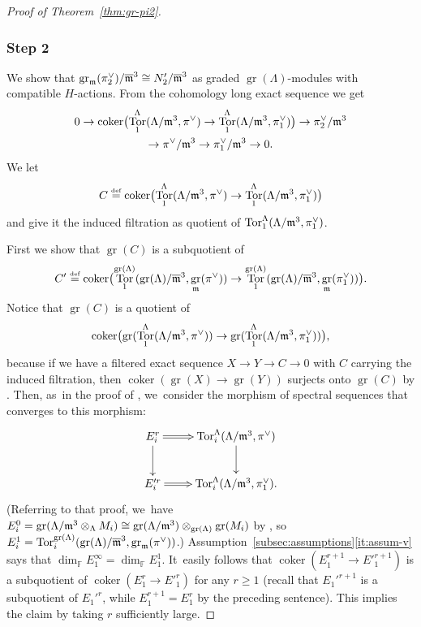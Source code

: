 \documentclass[JEP,XML,SOM,Unicode,NoFloatCountersInSection, NoEqCountersInSection,published]{cedram}
\let\ovl\overline
\newcommand{\defeq}{\stackrel{\textrm{\tiny{\upshape{def}}}}{=}}
\newcommand{\F}{\mathbb{F}}
\DeclareMathOperator{\coker}{coker}
\DeclareMathOperator{\gr}{gr}
\DeclareMathOperator{\Tor}{Tor}
\theoremstyle{plain}
\theoremstyle{definition}
\begin{document}
\begin{proof}[Proof of Theorem~\ref{thm:gr-pi2}]
\subsubsection*{Step 2} We show that $\gr_\m(\pi_2^\vee)/ \ovl\m^3 \cong N_2'/\ovl\m^3$ as graded $\gr(\Lambda)$-modules with compatible $H$-actions.
From the cohomology long exact sequence we get
\begin{multline}\label{eq:coho-seq}
0 \to \coker\bigl(\Tor_1^\Lambda(\Lambda/\m^3,\pi^\vee) \to \Tor_1^\Lambda(\Lambda/\m^3,\pi_1^\vee)\bigr) \to \pi_2^\vee/\m^3\\
\to \pi^\vee/\m^3 \to \pi_1^\vee/\m^3 \to 0.
\end{multline}
We let
\begin{equation*}
C \defeq \coker\bigl(\Tor_1^\Lambda(\Lambda/\m^3,\pi^\vee) \to \Tor_1^\Lambda(\Lambda/\m^3,\pi_1^\vee)\bigr)
\end{equation*}
and give it the induced filtration as quotient of $\Tor_1^\Lambda(\Lambda/\m^3,\pi_1^\vee)$.

First we show that $\gr(C)$ is a subquotient of
\begin{equation}\label{eq:coker-Tor1-gr}
C' \defeq \coker\bigl(\Tor_1^{\gr(\Lambda)}(\gr(\Lambda)/\ovl\m^3,\gr_{\m}(\pi^{\vee})) \to \Tor_1^{\gr(\Lambda)}(\gr(\Lambda)/\ovl\m^3,\gr_{\m}(\pi_1^{\vee}))\bigr).
\end{equation}
Notice that $\gr(C)$ is a quotient of
\begin{equation*}
\coker\bigl(\gr(\Tor_1^{\Lambda}(\Lambda/\m^3,\pi^{\vee})) \to \gr(\Tor_1^{\Lambda}(\Lambda/\m^3,\pi_1^{\vee}))\bigr),
\end{equation*}
because if we have a filtered exact sequence $X \to Y \to C \to 0$ with $C$ carrying the induced filtration, then $\coker(\gr(X) \to \gr(Y))$ surjects onto $\gr(C)$ by \cite[Th.\,I.4.2.4(1)]{LiOy}.
Then, as~in the proof of \cite[Prop.\,2.4.9]{BHHMS4}, we~consider the morphism of spectral sequences that converges to this morphism:
\begin{equation*}
\begin{gathered}
\xymatrix{E_i^r\ar@{=>}[r]\ar[d]&\Tor_i^{\Lambda}(\Lambda/\m^3,\pi^{\vee})\ar[d]\\
E'^r_i\ar@{=>}[r]&\Tor_i^{\Lambda}(\Lambda/\m^3,\pi_1^{\vee}).}
\end{gathered}
\end{equation*}
(Referring to that proof, we~have $E_i^0 = \gr(\Lambda/\m^3 \otimes_\Lambda M_i) \cong \gr(\Lambda/\m^3) \otimes_{\gr(\Lambda)} \gr(M_i)$ by \cite[Lem.\,I.6.14]{LiOy}, so~$E_i^1 = \Tor_i^{\gr(\Lambda)}(\gr(\Lambda)/\ovl\m^3,\gr_{\m}(\pi^{\vee}))$.)
Assumption~\ref{subsec:assumptions}\eqref{it:assum-v} says that $\dim_\F E_1^\infty = \dim_\F E_1^1$. It~easily follows that $\coker(E_1^{r+1} \to E'^{r+1}_1)$ is a subquotient of $\coker(E_1^r \to E'^r_1)$ for any $r \ge 1$ (recall that $E_1'^{r+1}$ is a subquotient of $E_1'^r$, while $E^{r+1}_1=E^{r}_1$ by the preceding sentence).
This implies the claim by taking $r$ sufficiently large.


\end{proof}
\end{document}
